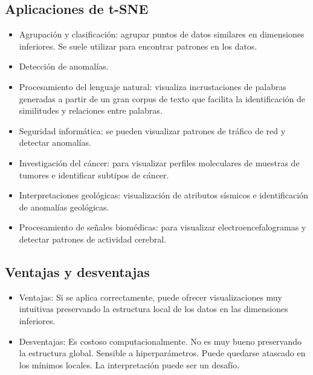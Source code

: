 \subsection{Aplicaciones de t-SNE}
\begin{itemize}
    \item Agrupación y clasificación: agrupar puntos de datos similares en dimensiones inferiores. Se suele utilizar para encontrar patrones en los datos.

    \item Detección de anomalías.

    \item Procesamiento del lenguaje natural: visualiza incrustaciones de palabras generadas a partir de un gran corpus de texto que facilita la identificación de similitudes y relaciones entre palabras.

    \item Seguridad informática: se pueden visualizar patrones de tráfico de red y detectar anomalías.

    \item Investigación del cáncer: para visualizar perfiles moleculares de muestras de tumores e identificar subtipos de cáncer.

    \item Interpretaciones geológicas: visualización de atributos sísmicos e identificación de anomalías geológicas.

    \item Procesamiento de señales biomédicas: para visualizar electroencefalogramas y detectar patrones de actividad cerebral.
\end{itemize}

\subsection{Ventajas y desventajas}
\begin{itemize}
    \item Ventajas: Si se aplica correctamente, puede ofrecer visualizaciones muy intuitivas preservando la estructura local de los datos en las dimensiones inferiores.

    \item Desventajas:  Es costoso computacionalmente. No es muy bueno preservando la estructura global. Sensible a hiperparámetros. Puede quedarse atascado en los mínimos locales. La interpretación puede ser un desafío.
\end{itemize}


